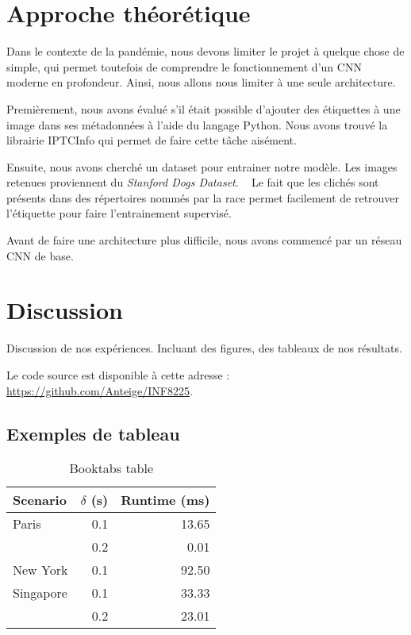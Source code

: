 \documentclass{article}
\begin{document}
\section{Approche théorétique}
Dans le contexte de la pandémie, nous devons limiter le projet à quelque chose de
simple, qui permet toutefois de comprendre le fonctionnement d'un CNN moderne
en profondeur. Ainsi, nous allons nous limiter à une seule architecture.

Premièrement, nous avons évalué s'il était possible d'ajouter des étiquettes à une
image dans ses métadonnées à l'aide du langage Python. Nous avons trouvé la
librairie IPTCInfo qui permet de faire cette tâche aisément.

Ensuite, nous avons cherché un dataset pour entrainer notre modèle. Les images
retenues proviennent du \textit{Stanford Dogs Dataset}.
 ~\cite{KhoslaYaoJayadevaprakashFeiFei_FGVC2011} Le fait que les clichés sont
présents dans des répertoires nommés par la race permet facilement de retrouver
l'étiquette pour faire l'entrainement supervisé.

Avant de faire une architecture plus difficile, nous avons commencé par un réseau
CNN de base.

\section{Discussion}

Discussion de nos expériences. Incluant des figures, des tableaux de nos résultats.

Le code source est disponible à cette adresse : \url{https://github.com/Anteige/INF8225}.

\subsection{Exemples de tableau}

\begin{table}
\centering
\begin{tabular}{lrr}  
\toprule
Scenario  & $\delta$ (s) & Runtime (ms) \\
\midrule
Paris       & 0.1  & 13.65      \\
            & 0.2  & 0.01       \\
New York    & 0.1  & 92.50      \\
Singapore   & 0.1  & 33.33      \\
            & 0.2  & 23.01      \\
\bottomrule
\end{tabular}
\caption{Booktabs table}
\label{tab:booktabs}
\end{table}
\end{document}
